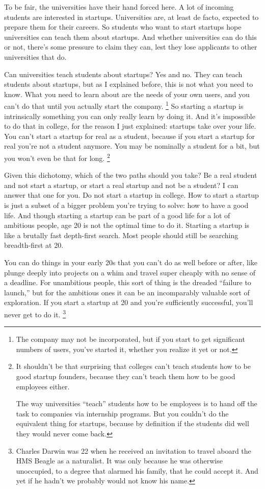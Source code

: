 To be fair, the universities have their hand forced here. A lot of
incoming students are interested in startups. Universities are, at least
de facto, expected to prepare them for their careers. So students who
want to start startups hope universities can teach them about startups.
And whether universities can do this or not, there's some pressure to
claim they can, lest they lose applicants to other universities that do.

Can universities teach students about startups? Yes and no. They can
teach students about startups, but as I explained before, this is not
what you need to know. What you need to learn about are the needs of
your own users, and you can't do that until you actually start the
company. \footnote{The company may not be incorporated, but if you start to get
significant numbers of users, you've started it, whether you realize it
yet or not.} So starting a startup is intrinsically
something you can only really learn by doing it. And it's impossible to
do that in college, for the reason I just explained: startups take over
your life. You can't start a startup for real as a student, because if
you start a startup for real you're not a student anymore. You may be
nominally a student for a bit, but you won't even be that for long.
\footnote{It shouldn't be that surprising that colleges can't teach
students how to be good startup founders, because they can't teach them
how to be good employees either.

The way universities ``teach'' students how to be employees is to hand
off the task to companies via internship programs. But you couldn't do
the equivalent thing for startups, because by definition if the students
did well they would never come back.}

Given this dichotomy, which of the two paths should you take? Be a real
student and not start a startup, or start a real startup and not be a
student? I can answer that one for you. Do not start a startup in
college. How to start a startup is just a subset of a bigger problem
you're trying to solve: how to have a good life. And though starting a
startup can be part of a good life for a lot of ambitious people, age 20
is not the optimal time to do it. Starting a startup is like a brutally
fast depth-first search. Most people should still be searching
breadth-first at 20.

You can do things in your early 20s that you can't do as well before or
after, like plunge deeply into projects on a whim and travel super
cheaply with no sense of a deadline. For unambitious people, this sort
of thing is the dreaded ``failure to launch,'' but for the ambitious
ones it can be an incomparably valuable sort of exploration. If you
start a startup at 20 and you're sufficiently successful, you'll never
get to do it. \footnote{Charles Darwin was 22 when he received an invitation to travel
aboard the HMS Beagle as a naturalist. It was only because he was
otherwise unoccupied, to a degree that alarmed his family, that he could
accept it. And yet if he hadn't we probably would not know his name.}

